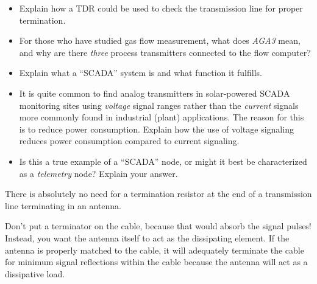 \begin{itemize}
\item{} Explain how a TDR could be used to check the transmission line for proper termination.
\item{} For those who have studied gas flow measurement, what does {\it AGA3} mean, and why are there {\it three} process transmitters connected to the flow computer?
\item{} Explain what a ``SCADA'' system is and what function it fulfills.
\item{} It is quite common to find analog transmitters in solar-powered SCADA monitoring sites using {\it voltage} signal ranges rather than the {\it current} signals more commonly found in industrial (plant) applications.  The reason for this is to reduce power consumption.  Explain how the use of voltage signaling reduces power consumption compared to current signaling.
\item{} Is this a true example of a ``SCADA'' node, or might it best be characterized as a {\it telemetry} node?  Explain your answer.
\end{itemize}







There is absolutely no need for a termination resistor at the end of a transmission line terminating in an antenna.







Don't put a terminator on the cable, because that would absorb the signal pulses!  Instead, you want the antenna itself to act as the dissipating element.  If the antenna is properly matched to the cable, it will adequately terminate the cable for minimum signal reflections within the cable because the antenna will act as a dissipative load.




